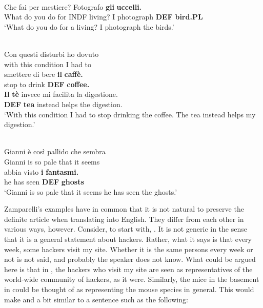 \z

\ea \label{} 
\\
\gll Che  fai  per  mestiere?  Fotografo  \textbf{gli} \textbf{  uccelli.}\\
What do you  do  for  INDF living?  I photograph  \textbf{DEF} \textbf{bird.PL}\\
\glt ‘What do you do for a living? I photograph the birds.’

\z

\ea \label{} 
\\
\gll Con  questi  disturbi  ho  dovuto\\
with  this  condition  I  had to\\
\gll smettere  di  bere  \textbf{il} \textbf{caffè.} \\
stop  to  drink  \textbf{DEF} \textbf{coffee.}\\
\gll \textbf{Il} \textbf{tè} invece  mi facilita  la digestione.\\
\textbf{DEF} \textbf{tea} instead  helps  the digestion.\\
\glt ‘With this condition I had to stop drinking the coffee. The tea instead helps my digestion.’

\z

\ea \label{} 
\\
	\gll Gianni  è  così  pallido  che  sembra\\
Gianni  is  so  pale  that  it seems\\
\gll abbia  visto  \textbf{i} \textbf{fantasmi.}   \\
he has  seen  \textbf{DEF} \textbf{ghosts}   \\
\glt ‘Gianni is so pale that it seems he has seen the ghosts.’

\z

Zamparelli’s examples have in common that it is not natural to preserve the definite article when translating into English. They differ from each other in various ways, however. Consider, to start with, . It is not generic in the sense that it is a general statement about hackers. Rather, what it says is that every week, some hackers visit my site. Whether it is the same persons every week or not is not said, and probably the speaker does not know. What could be argued here is that in , the hackers who visit my site are seen as representatives of the world-wide community of hackers, as it were. Similarly, the mice in the basement in  could be thought of as representing the mouse species in general. This would make  and  a bit similar to a sentence such as the following: 

